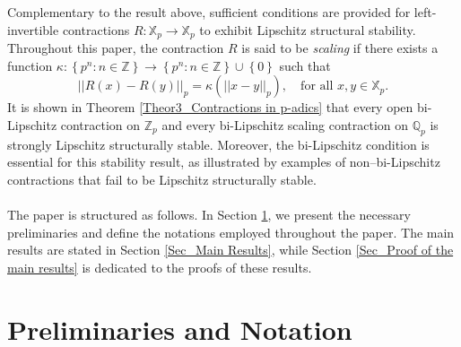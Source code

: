 \documentclass[a4paper, 12pt]{article}
\theoremstyle{definition}
\begin{document}
	
	Complementary to the result above, sufficient conditions are provided for left-invertible contractions $R: \mathbb{X}_{p} \to \mathbb{X}_{p}$ to exhibit Lipschitz structural stability. 
	Throughout this paper, the contraction $R$ is said to be \textit{scaling} if there exists a function $\kappa:  \left\{  p^{n}:   n \in \mathbb{Z}  \right\}  \to  \left\{  p^{n}:   n \in \mathbb{Z}  \right\} \cup  \left\{  0  \right\} $ such that 
	\begin{equation}\label{Eq_Scaling Maps}
		\left| \left|  R \left(  x  \right)  - R \left(  y  \right)   \right|  \right|_{p}   =   \kappa \left(   \left| \left|  x - y  \right|  \right|_{p}  \right)  , \quad \text{for all } x,y \in \mathbb{X}_{p} .
	\end{equation} 
	It is shown in Theorem \ref{Theor3_Contractions in p-adics} that every open bi-Lipschitz contraction on $\mathbb{Z}_{p}$ and every bi-Lipschitz scaling contraction on $\mathbb{Q}_{p}$ is strongly Lipschitz structurally stable. 
	Moreover, the bi-Lipschitz condition is essential for this stability result, as illustrated by examples of non–bi-Lipschitz contractions that fail to be Lipschitz structurally stable. 
	
	
	
	
	
	
	\paragraph{}	
	The paper is structured as follows. In Section \ref{Sec_Preliminaries and Notations}, we present the necessary preliminaries and define the notations employed throughout the paper.  
	The main results are stated in Section \ref{Sec_Main Results}, while Section \ref{Sec_Proof of the main results} is dedicated to the proofs of these results. 
	
	
	
	
	
	
	
	
	
	
	
	
	
	
	\section{Preliminaries and Notation}\label{Sec_Preliminaries and Notations}
	
\end{document}
